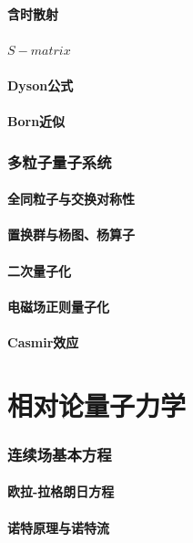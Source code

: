 \documentclass[a4paper,11pt]{article}
\theoremstyle{mystyle}
\begin{document}
\subsection{含时散射}
\subsection{$S-matrix$}
\subsection{Dyson公式}
\subsection{Born近似}
\section{多粒子量子系统}
\subsection{全同粒子与交换对称性}
\subsection{置换群与杨图、杨算子}
\subsection{二次量子化}
\subsection{电磁场正则量子化}
\subsection{Casmir效应}
\part{相对论量子力学}
\section{连续场基本方程}
\subsection{欧拉-拉格朗日方程}
\subsection{诺特原理与诺特流}
\end{document}
